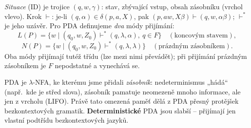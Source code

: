 \documentclass[11pt,a4paper]{article}
\begin{document}
\begin{definice}
\emph{Situace} (ID) je trojice $(q,w,\gamma)$: stav, zbývající vstup, obsah zásobníku (vrchol vlevo). Krok $\vdash$: je-li $(q,\alpha)\in\delta(p,a,X)$, pak $(p,aw,X\beta)\vdash(q,w,\alpha\beta)$; $\vdash^*$ je jeho uzávěr. Pro PDA definujeme \emph{dva} módy přijímání:
\[ L(P)=\{w\mid (q_0,w,Z_0)\vdash^*(q,\lambda,\alpha),\ q\in F\}\quad(\text{koncovým stavem}), \]
\[ N(P)=\{w\mid (q_0,w,Z_0)\vdash^*(q,\lambda,\lambda)\}\quad(\text{prázdným zásobníkem}). \]
Oba módy přijímají tutéž třídu (lze mezi nimi převádět); při přijímání prázdným zásobníkem je $F$ nepodstatné a vynechává se.
\end{definice}

\begin{intuice}
PDA je $\lambda$-NFA, ke kterému jsme přidali \emph{zásobník}: nedeterminismus „hádá`` (např.\ kde je střed slova), zásobník pamatuje neomezeně mnoho informace, ale jen z vrcholu (LIFO). Právě tato omezená paměť dělá z PDA přesný protějšek bezkontextových gramatik. \textbf{Deterministické} PDA jsou slabší -- přijímají jen vlastní podtřídu bezkontextových jazyků.
\end{intuice}

\begin{center}
\end{center}
\end{document}
